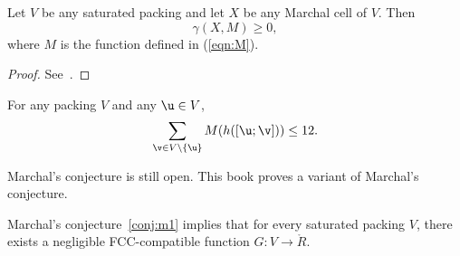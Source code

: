 \begin{theorem}\label{lemma:MI} 
Let $V$ be any saturated packing and let $X$ be any Marchal cell of $V$.  Then
\begin{equation}\label{eqn:mfe} 
\gamma(X,M)\ge 0,
\end{equation}
where $M$ is the function defined in (\ref{eqn:M}).
\end{theorem}

\begin{proof}  See~\cite{marchal:2009}.  
\end{proof}


\begin{conjecture}[Marchal]\label{conj:m1} 
For any packing $ V$ and
any $ \u\in V$,
\[  
\sum_{\v\in V\setminus\{\u\}} M(h([\u;\v])) \le 12.
\] 
\end{conjecture}

Marchal's conjecture is still open.  This book proves a variant of
Marchal's conjecture.

\begin{theorem}\label{theorem:mk1} 
Marchal's conjecture~\ref{conj:m1} implies
that for every saturated packing $V$, there exists a negligible FCC-compatible function
$G:V\to \ring{R}$.
\end{theorem}



